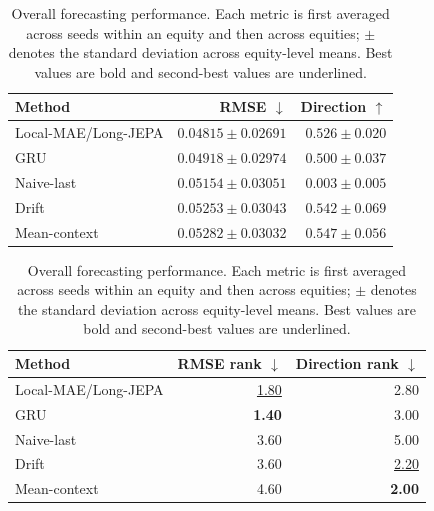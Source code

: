 \begin{table}[t]
\centering
\small
\caption{Overall forecasting performance. Each metric is first averaged across seeds within an equity and then across equities; $\pm$ denotes the standard deviation across equity-level means. Best values are bold and second-best values are underlined.}
\label{tab:main_metrics}
\begin{tabular}{lrr}
\toprule
Method & RMSE $\downarrow$ & Direction $\uparrow$ \\
\midrule
Local-MAE/Long-JEPA & \textbf{$0.04815 \pm 0.02691$} & $0.526 \pm 0.020$ \\
GRU & \underline{$0.04918 \pm 0.02974$} & $0.500 \pm 0.037$ \\
Naive-last & $0.05154 \pm 0.03051$ & $0.003 \pm 0.005$ \\
Drift & $0.05253 \pm 0.03043$ & \underline{$0.542 \pm 0.069$} \\
Mean-context & $0.05282 \pm 0.03032$ & \textbf{$0.547 \pm 0.056$} \\
\bottomrule
\end{tabular}
\par\medskip
\begin{tabular}{lrr}
\toprule
Method & RMSE rank $\downarrow$ & Direction rank $\downarrow$ \\
\midrule
Local-MAE/Long-JEPA & \underline{1.80} & 2.80 \\
GRU & \textbf{1.40} & 3.00 \\
Naive-last & 3.60 & 5.00 \\
Drift & 3.60 & \underline{2.20} \\
Mean-context & 4.60 & \textbf{2.00} \\
\bottomrule
\end{tabular}
\end{table}
